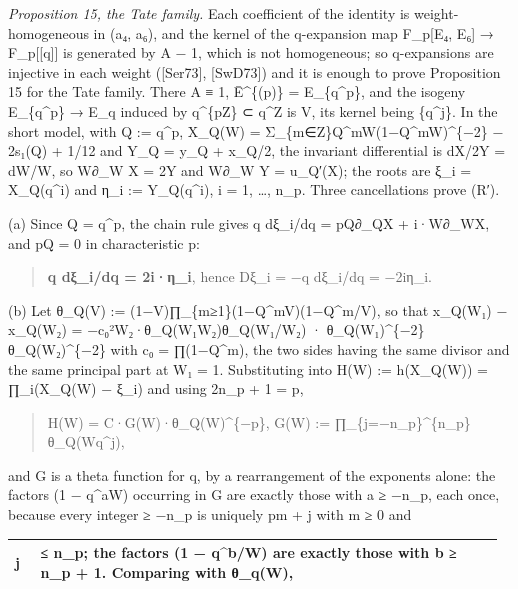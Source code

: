 \documentclass[11pt,a4paper]{article}
\theoremstyle{named}
\begin{document}
\textit{Proposition 15, the Tate family.} Each coefficient of the identity is weight-homogeneous in (a₄, a₆), and the kernel of the q-expansion map F\_p[E₄, E₆] → F\_p[[q]] is generated by A − 1, which is not homogeneous; so q-expansions are injective in each weight ([Ser73], [SwD73]) and it is enough to prove Proposition 15 for the Tate family. There A ≡ 1, Ē\textasciicircum{}\{(p)\} = E\_\{q\textasciicircum{}p\}, and the isogeny E\_\{q\textasciicircum{}p\} → E\_q induced by q\textasciicircum{}\{pZ\} ⊂ q\textasciicircum{}Z is V, its kernel being \{q\textasciicircum{}j\}. In the short model, with Q := q\textasciicircum{}p, X\_Q(W) = Σ\_\{m∈Z\}Q\textasciicircum{}mW(1−Q\textasciicircum{}mW)\textasciicircum{}\{−2\} − 2s₁(Q) + 1/12 and Y\_Q = y\_Q + x\_Q/2, the invariant differential is dX/2Y = dW/W, so W∂\_W X = 2Y and W∂\_W Y = u\_Q′(X); the roots are ξ\_i = X\_Q(q\textasciicircum{}i) and η\_i := Y\_Q(q\textasciicircum{}i), i = 1, …, n\_p. Three cancellations prove (R′).

(a) Since Q = q\textasciicircum{}p, the chain rule gives q dξ\_i/dq = pQ∂\_QX + i·W∂\_WX, and pQ = 0 in characteristic p:

\begin{quote}
\textbf{q dξ\_i/dq = 2i·η\_i},  hence  Dξ\_i = −q dξ\_i/dq = −2iη\_i.
\end{quote}

(b) Let θ\_Q(V) := (1−V)∏\_\{m≥1\}(1−Q\textasciicircum{}mV)(1−Q\textasciicircum{}m/V), so that x\_Q(W₁) − x\_Q(W₂) = −c₀²W₂·θ\_Q(W₁W₂)θ\_Q(W₁/W₂) · θ\_Q(W₁)\textasciicircum{}\{−2\}θ\_Q(W₂)\textasciicircum{}\{−2\} with c₀ = ∏(1−Q\textasciicircum{}m), the two sides having the same divisor and the same principal part at W₁ = 1. Substituting into H(W) := h(X\_Q(W)) = ∏\_i(X\_Q(W) − ξ\_i) and using 2n\_p + 1 = p,

\begin{quote}
H(W) = C·G(W)·θ\_Q(W)\textasciicircum{}\{−p\},  G(W) := ∏\_\{j=−n\_p\}\textasciicircum{}\{n\_p\}θ\_Q(Wq\textasciicircum{}j),
\end{quote}

and G is a theta function for q, by a rearrangement of the exponents alone: the factors (1 − q\textasciicircum{}aW) occurring in G are exactly those with a ≥ −n\_p, each once, because every integer ≥ −n\_p is uniquely pm + j with m ≥ 0 and
\begin{center}\begin{small}
\begin{tabular}{>{\raggedright\arraybackslash}p{0.056\linewidth}>{\raggedright\arraybackslash}p{0.916\linewidth}}
\hline
j & ≤ n\_p; the factors (1 − q\textasciicircum{}b/W) are exactly those with b ≥ n\_p + 1. Comparing with θ\_q(W), \\
\hline
\hline
\end{tabular}
\end{small}\end{center}
\end{document}

